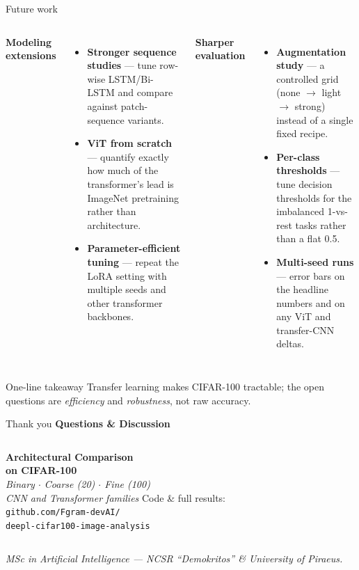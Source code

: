 \documentclass[aspectratio=169,11pt]{beamer}
\newcommand{\source}[1]{{\footnotesize\itshape\textcolor{softgrey}{#1}}}
\begin{document}
\begin{frame}{Future work}
  \begin{columns}[T,onlytextwidth]
      \textbf{Modeling extensions}
      \begin{itemize}
        \item \textbf{Stronger sequence studies} --- tune row-wise LSTM/Bi-LSTM and compare
              against patch-sequence variants.
        \item \textbf{ViT from scratch} --- quantify exactly how much of the
              transformer's lead is ImageNet pretraining rather than architecture.
        \item \textbf{Parameter-efficient tuning} --- repeat the LoRA setting with
              multiple seeds and other transformer backbones.
      \end{itemize}
      \textbf{Sharper evaluation}
      \begin{itemize}
        \item \textbf{Augmentation study} --- a controlled grid (none $\to$ light $\to$
              strong) instead of a single fixed recipe.
        \item \textbf{Per-class thresholds} --- tune decision thresholds for the
              imbalanced 1-vs-rest tasks rather than a flat 0.5.
        \item \textbf{Multi-seed runs} --- error bars on the headline numbers and on any
              ViT and transfer-CNN deltas.
      \end{itemize}
  \end{columns}
  \vfill
  \begin{block}{One-line takeaway}
    Transfer learning makes CIFAR-100 tractable; the open questions are \emph{efficiency}
    and \emph{robustness}, not raw accuracy.
  \end{block}
\end{frame}


\begin{frame}{Thank you}
  \vfill
  \centering
  {\Large\textbf{Questions \& Discussion}}\\[1.2em]

  \begin{columns}[c,onlytextwidth]
      \centering
      \textbf{Architectural Comparison\\on CIFAR-100}\\[0.4em]
      \source{Binary $\cdot$ Coarse (20) $\cdot$ Fine (100)\\CNN and Transformer families}
      \centering
      {\footnotesize Code \& full results:}\\[0.5em]
      \texttt{github.com/Fgram-devAI/}\\
      \texttt{deepl-cifar100-image-analysis}
  \end{columns}

  \vfill
  \source{MSc in Artificial Intelligence --- NCSR ``Demokritos'' \& University of Piraeus.}
\end{frame}
\end{document}
